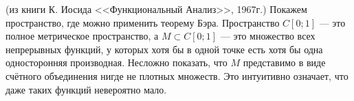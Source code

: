 \begin{example} (из книги К. Иосида <<Функциональный Анализ>>, 1967г.)
	Покажем пространство, где можно применить теорему Бэра. Пространство $C[0; 1]$ --- это полное метрическое пространство, а $M \subset C[0; 1]$ --- это множество всех непрерывных функций, у которых хотя бы в одной точке есть хотя бы одна односторонняя производная. Несложно показать, что $M$ представимо в виде счётного объединения нигде не плотных множеств. Это интуитивно означает, что даже таких функций невероятно мало.
\end{example}